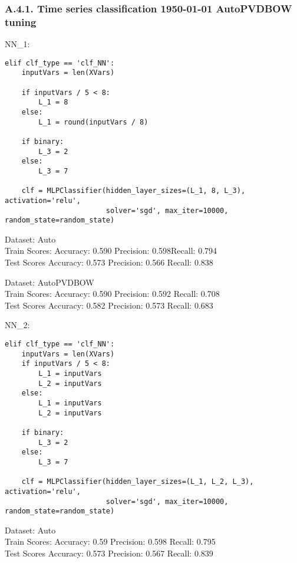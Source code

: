 \documentclass[11pt,preprint, authoryear]{elsarticle}
\numberwithin{equation}{section}
\numberwithin{figure}{section}
\numberwithin{table}{section}
\begin{document}
\hypertarget{a.4.1.-time-series-classification-1950-01-01-autopvdbow-tuning}{%
\subsubsection*{A.4.1. Time series classification 1950-01-01 AutoPVDBOW
tuning}\label{a.4.1.-time-series-classification-1950-01-01-autopvdbow-tuning}}

NN\_1:

\begin{verbatim}
elif clf_type == 'clf_NN':
    inputVars = len(XVars)

    if inputVars / 5 < 8:
        L_1 = 8
    else:
        L_1 = round(inputVars / 8)

    if binary:
        L_3 = 2
    else:
        L_3 = 7

    clf = MLPClassifier(hidden_layer_sizes=(L_1, 8, L_3), activation='relu',
                        solver='sgd', max_iter=10000, random_state=random_state)
\end{verbatim}

Dataset: Auto\\
Train Scores: Accuracy: 0.590 Precision: 0.598Recall: 0.794\\
Test Scores Accuracy: 0.573 Precision: 0.566 Recall: 0.838

Dataset: AutoPVDBOW\\
Train Scores: Accuracy: 0.590 Precision: 0.592 Recall: 0.708\\
Test Scores Accuracy: 0.582 Precision: 0.573 Recall: 0.683

NN\_2:

\begin{verbatim}
elif clf_type == 'clf_NN':
    inputVars = len(XVars)
    if inputVars / 5 < 8:
        L_1 = inputVars
        L_2 = inputVars
    else:
        L_1 = inputVars
        L_2 = inputVars

    if binary:
        L_3 = 2
    else:
        L_3 = 7

    clf = MLPClassifier(hidden_layer_sizes=(L_1, L_2, L_3), activation='relu',
                        solver='sgd', max_iter=10000, random_state=random_state)

\end{verbatim}

Dataset: Auto\\
Train Scores: Accuracy: 0.59 Precision: 0.598 Recall: 0.795\\
Test Scores Accuracy: 0.573 Precision: 0.567 Recall: 0.839
\end{document}
